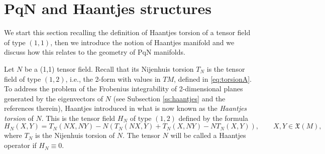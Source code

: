 \documentclass[12pt]{article}
\newtheorem{remark}[theorem]{Remark}
\begin{document}


\section{PqN and Haantjes structures}\label{sec:4}

We start this section recalling the definition of Haantjes torsion of a tensor field of type $(1,1)$, then we introduce the notion of Haantjes manifold and we discuss how this relates to the geometry of PqN manifolds. 

Let $N$ be a (1,1) tensor field. Recall that its Nijenhuis torsion $T_N$ is the tensor field of type $(1,2)$, i.e., the 2-form with values in $TM$, defined in \eqref{eq:torsionA}. To address the problem of the Frobenius integrability of 2-dimensional planes generated by the eigenvectors of $N$ (see Subsection \ref{ss:haantjes} 
and the references therein), 
Haantjes introduced in \cite{Haantjes} what is now known as the \emph{Haantjes torsion} of $N$. This is the tensor field 
$H_N$ of type $(1,2)$ defined by the formula
\begin{equation}
H_N(X,Y)=T_N(NX,NY)-N(T_N(NX,Y)+T_N(X,NY)-NT_N(X,Y)),\qquad
X,Y\in\mathfrak X(M), \label{eq:haant}
\end{equation}
where $T_N$ is the Nijenhuis torsion of $N$. The tensor $N$ will be called a Haantjes operator if $H_N\equiv 0$.
\end{document}
